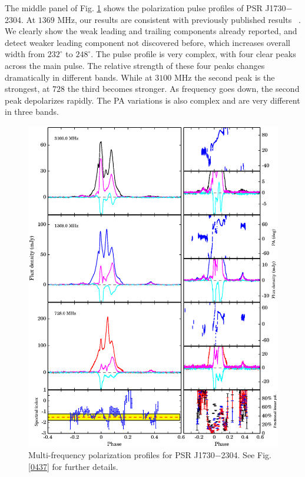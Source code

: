 \documentclass[useAMS,usenatbib]{mn2e}
\begin{document}
The middle panel of Fig. \ref{1730} shows the polarization pulse profiles of 
PSR J1730$-$2304.
%
At $1369$ MHz, our results are consistent with previously published results
~\citep{Ord04,Yan11}. 
%
We clearly show the weak leading and trailing components already reported, 
and detect weaker leading component not discovered before, which increases 
overall width from $232^{\circ}$ to $248^{\circ}$.
%
The pulse profile is very complex, with four clear peaks across the main pulse.
%
The relative strength of these four peaks changes dramatically in different 
bands. While at $3100$ MHz the second peak is the strongest, at $728$ the third 
becomes stronger. 
%
As frequency goes down, the second peak depolarizes rapidly.
%
The PA variations is also complex and are very different in three bands.

\begin{figure}
\begin{center}
\includegraphics[width=6 in]{1730.ps}
\caption{Multi-frequency polarization profiles for PSR J1730$-$2304. 
See Fig. \ref{0437} for further details.}
\label{1730}
\end{center}
\end{figure}
\end{document}
